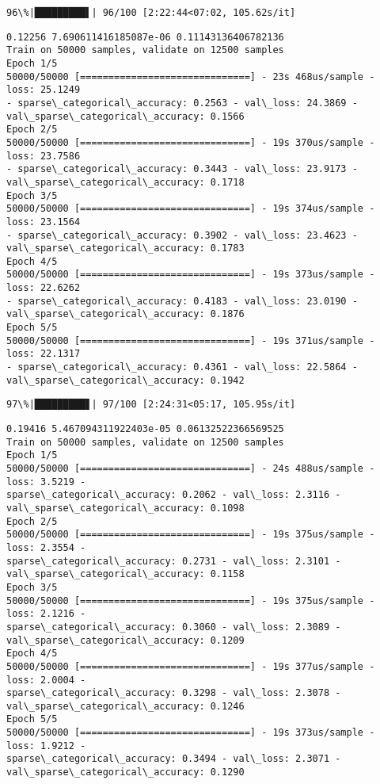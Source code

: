 \documentclass[11pt]{article}
\begin{document}
    \begin{Verbatim}[commandchars=\\\{\}]
 96\%|█████████▌| 96/100 [2:22:44<07:02, 105.62s/it]
    \end{Verbatim}

    \begin{Verbatim}[commandchars=\\\{\}]
0.12256 7.690611416185087e-06 0.11143136406782136
Train on 50000 samples, validate on 12500 samples
Epoch 1/5
50000/50000 [==============================] - 23s 468us/sample - loss: 25.1249
- sparse\_categorical\_accuracy: 0.2563 - val\_loss: 24.3869 -
val\_sparse\_categorical\_accuracy: 0.1566
Epoch 2/5
50000/50000 [==============================] - 19s 370us/sample - loss: 23.7586
- sparse\_categorical\_accuracy: 0.3443 - val\_loss: 23.9173 -
val\_sparse\_categorical\_accuracy: 0.1718
Epoch 3/5
50000/50000 [==============================] - 19s 374us/sample - loss: 23.1564
- sparse\_categorical\_accuracy: 0.3902 - val\_loss: 23.4623 -
val\_sparse\_categorical\_accuracy: 0.1783
Epoch 4/5
50000/50000 [==============================] - 19s 373us/sample - loss: 22.6262
- sparse\_categorical\_accuracy: 0.4183 - val\_loss: 23.0190 -
val\_sparse\_categorical\_accuracy: 0.1876
Epoch 5/5
50000/50000 [==============================] - 19s 371us/sample - loss: 22.1317
- sparse\_categorical\_accuracy: 0.4361 - val\_loss: 22.5864 -
val\_sparse\_categorical\_accuracy: 0.1942
    \end{Verbatim}

    \begin{Verbatim}[commandchars=\\\{\}]
 97\%|█████████▋| 97/100 [2:24:31<05:17, 105.95s/it]
    \end{Verbatim}

    \begin{Verbatim}[commandchars=\\\{\}]
0.19416 5.467094311922403e-05 0.06132522366569525
Train on 50000 samples, validate on 12500 samples
Epoch 1/5
50000/50000 [==============================] - 24s 488us/sample - loss: 3.5219 -
sparse\_categorical\_accuracy: 0.2062 - val\_loss: 2.3116 -
val\_sparse\_categorical\_accuracy: 0.1098
Epoch 2/5
50000/50000 [==============================] - 19s 375us/sample - loss: 2.3554 -
sparse\_categorical\_accuracy: 0.2731 - val\_loss: 2.3101 -
val\_sparse\_categorical\_accuracy: 0.1158
Epoch 3/5
50000/50000 [==============================] - 19s 375us/sample - loss: 2.1216 -
sparse\_categorical\_accuracy: 0.3060 - val\_loss: 2.3089 -
val\_sparse\_categorical\_accuracy: 0.1209
Epoch 4/5
50000/50000 [==============================] - 19s 377us/sample - loss: 2.0004 -
sparse\_categorical\_accuracy: 0.3298 - val\_loss: 2.3078 -
val\_sparse\_categorical\_accuracy: 0.1246
Epoch 5/5
50000/50000 [==============================] - 19s 373us/sample - loss: 1.9212 -
sparse\_categorical\_accuracy: 0.3494 - val\_loss: 2.3071 -
val\_sparse\_categorical\_accuracy: 0.1290
    \end{Verbatim}
\end{document}
